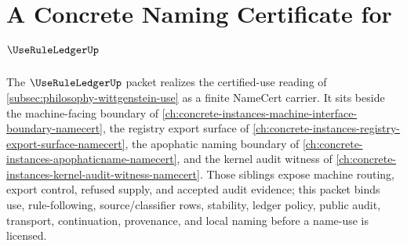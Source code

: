 \chapter{A Concrete Naming Certificate for $\UseRuleLedgerUp$}
\label{ch:concrete-instances-use-rule-ledger-namecert}

The $\UseRuleLedgerUp$ packet realizes the certified-use reading of \autoref{subsec:philosophy-wittgenstein-use} as a finite NameCert carrier. It sits beside the machine-facing boundary of \autoref{ch:concrete-instances-machine-interface-boundary-namecert}, the registry export surface of \autoref{ch:concrete-instances-registry-export-surface-namecert}, the apophatic naming boundary of \autoref{ch:concrete-instances-apophaticname-namecert}, and the kernel audit witness of \autoref{ch:concrete-instances-kernel-audit-witness-namecert}. Those siblings expose machine routing, export control, refused supply, and accepted audit evidence; this packet binds use, rule-following, source/classifier rows, stability, ledger policy, public audit, transport, continuation, provenance, and local naming before a name-use is licensed.

